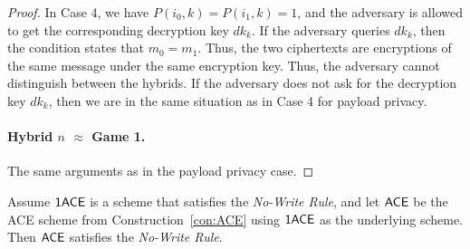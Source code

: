 \documentclass{llncs}
\begin{document}
\begin{proof}
In Case 4, we have $P(i_0,k)=P(i_1,k)=1$, and the adversary is allowed to get the corresponding decryption key $dk_k$. If the adversary queries $dk_k$, then the condition states that $m_0 = m_1$. Thus, the two \oACE ciphertexts are encryptions of the same message under the same \oACE encryption key. Thus, the adversary cannot distinguish between the hybrids.
If the adversary does not ask for the decryption key $dk_k$, then we are in the same situation as in Case 4 for payload privacy.

\paragraph{Hybrid $n$ $\approx$ Game 1.} The same arguments as in the payload privacy case.


\end{proof}



\begin{thm} \label{thm:no-write}
Assume $\mathsf{1ACE}$ is a \oACE scheme that satisfies the \emph{No-Write Rule}, and let $\mathsf{ACE}$ be the ACE scheme from Construction~\ref{con:ACE} using $\mathsf{1ACE}$ as the underlying \oACE scheme. Then $\mathsf{ACE}$ satisfies the \emph{No-Write Rule}. 
\end{thm}
\end{document}
